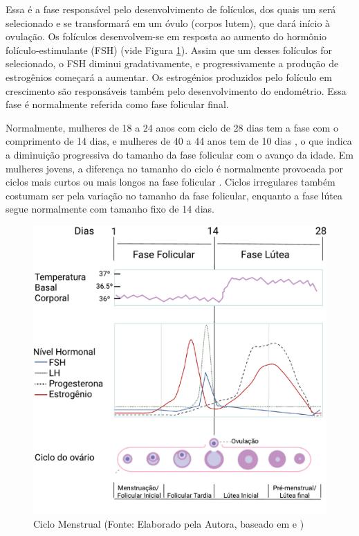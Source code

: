 Essa é a fase responsável pelo desenvolvimento de folículos, dos quais um
será selecionado e se transformará em um óvulo (corpos lutem), que dará início
à ovulação. Os folículos desenvolvem-se em resposta ao aumento do hormônio
folículo-estimulante (FSH) (vide Figura \ref{fig01}). Assim que um desses 
folículos for selecionado, o FSH diminui gradativamente, e progressivamente a produção de
estrogênios começará a aumentar. Os estrogénios produzidos pelo folículo em
crescimento são responsáveis também pelo desenvolvimento do endométrio. Essa fase é normalmente 
referida como fase folicular final.


Normalmente, mulheres de 18 a 24 anos com ciclo de 28 dias tem a fase com
o comprimento de 14 dias, e mulheres de 40 a 44 anos tem de 10 dias
\cite{lenton1984a}, o que indica a diminuição progressiva do tamanho da
fase folicular com o avanço da idade. Em mulheres jovens, a diferença no
tamanho do ciclo é normalmente provocada por ciclos mais curtos ou mais
longos na fase folicular \cite{lenton1984a}. Ciclos irregulares também
costumam ser pela variação no tamanho da fase folicular, enquanto a fase
lútea segue normalmente com tamanho fixo de 14 dias.


\begin{figure}[h]
	\centering
	\includegraphics[keepaspectratio=true,scale=0.6]{figuras/ciclomenstrual.pdf}
	\caption{Ciclo Menstrual (Fonte: Elaborado pela Autora, baseado em \cite{draper2018} e \cite{reed2018})}
        \label{fig01}
\end{figure}

